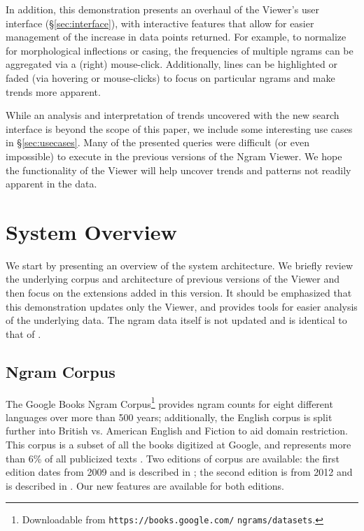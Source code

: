 \documentclass[11pt]{article}
\begin{document}
In addition, this demonstration presents an overhaul of the Viewer's user interface (\S\ref{sec:interface}), with interactive features that allow for easier management of the increase in data points returned. For example, to normalize for morphological inflections or casing, the frequencies of multiple ngrams can be aggregated via a (right) mouse-click. Additionally, lines can be highlighted or faded (via hovering or mouse-clicks) to focus on particular ngrams and make trends more apparent.


While an analysis and interpretation of trends uncovered with the new search interface is beyond the scope of this paper, we include some interesting use cases in \S\ref{sec:usecases}. Many of the presented queries were difficult (or even impossible) to execute in the previous versions of the Ngram Viewer. We hope the functionality of the Viewer will help uncover trends and patterns not readily apparent in the data.


\section{System Overview}
\label{sec:overview}

We start by presenting an overview of the system architecture. We briefly review the underlying corpus and architecture of previous versions of the Viewer \cite{culturomics,lin2012syntactic} and then focus on the extensions added in this version. It should be emphasized that this demonstration updates only the Viewer, and provides tools for easier analysis of the underlying data. The ngram data itself is not updated and is identical to that of .


\subsection{Ngram Corpus}
	The Google Books Ngram Corpus\footnote{Downloadable from \texttt{https://books.google.com/} \texttt{ngrams/datasets}.} provides ngram counts for eight different languages over more than 500 years; additionally, the English corpus is split further into British vs. American English and Fiction to aid domain restriction. This corpus is a subset of all the books digitized at Google, and represents more than 6\% of all publicized texts \cite{lin2012syntactic}. Two editions of corpus are available: the first edition dates from 2009 and is described in ; the second edition is from 2012 and is described in . Our new features are available for both editions.
\end{document}
